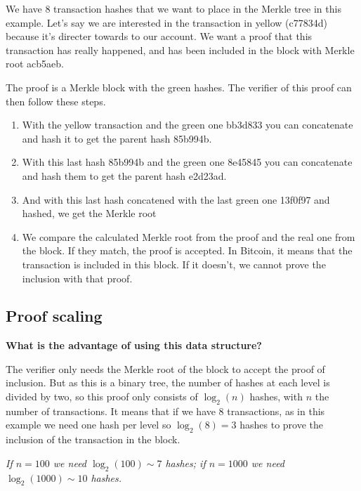 We have 8 transaction hashes that we want to place in the Merkle tree in this example. Let's say we are interested in the transaction in yellow (c77834d) because it's directer towards to our account. We want a proof that this transaction has really happened, and has been included in the block with Merkle root acb5aeb. 

The proof is a Merkle block with the green hashes. The verifier of this proof can then follow these steps.
\begin{enumerate}
    \item With the yellow transaction and the green one bb3d833 you can concatenate and hash it to get the parent hash 85b994b.
    \item With this last hash 85b994b and the green one 8e45845 you can concatenate and hash them to get the parent hash e2d23ad.
    \item And with this last hash concatened with the last green one 13f0f97 and hashed, we get the Merkle root
    \item We compare the calculated Merkle root from the proof and the real one from the block. If they match, the proof is accepted.
    In Bitcoin, it means that the transaction is included in this block. If it doesn't, we cannot prove the inclusion with that proof. 
\end{enumerate} 
\subsection{Proof scaling}
\textbf{
What is the advantage of using this data structure?}

The verifier only needs the Merkle root of the block to accept the proof of inclusion. But as this is a binary tree, the number of hashes at each level is divided by two, so this proof only consists of $\log_2(n)$ hashes, with $n$ the number of transactions. 
It means that if we have 8 transactions, as in this example we  need one hash per level so $\log_2(8)=3$ hashes to prove the inclusion of the transaction in the block.

\textit{
If $n=100$ we need $\log_2(100)\sim 7$ hashes; if $n=1000$ we need $\log_2(1000)\sim 10$ hashes.
}


